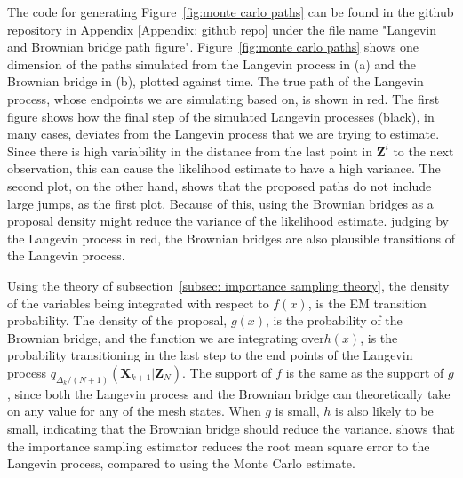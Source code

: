 The code for generating Figure~\ref{fig:monte carlo paths} can be found in the github repository in Appendix \ref{Appendix: github repo} under the file name "Langevin and Brownian bridge path figure". Figure~\ref{fig:monte carlo paths} shows one dimension of the paths simulated from the Langevin process in (a) and the Brownian bridge in (b), plotted against time. The true path of the Langevin process, whose endpoints we are simulating based on, is shown in red. The first figure shows how the final step of the simulated Langevin processes (black), in many cases, deviates from the Langevin process that we are trying to estimate. Since there is high variability in the distance from the last point in $\textbf{Z}^i$ to the next observation, this can cause the likelihood estimate to have a high variance. The second plot, on the other hand, shows that the proposed paths do not include large jumps, as the first plot. Because of this, using the Brownian bridges as a proposal density might reduce the variance of the likelihood estimate. judging by the Langevin process in red, the Brownian bridges are also plausible transitions of the Langevin process. 


Using the theory of subsection~\ref{subsec: importance sampling theory}, the density of the variables being integrated with respect to $f(x)$, is the EM transition probability. The density of the proposal, $g(x)$, is the probability of the Brownian bridge, and the function we are integrating over$h(x)$, is the probability transitioning in the last step to the end points of the Langevin process $q_{\Delta_k/(N+1)}(\textbf{X}_{k+1}|\textbf{Z}_N)$. The support of $f$ is the same as the support of $g$, since both the Langevin process and the Brownian bridge can theoretically take on any value for any of the mesh states. When $g$ is small, $h$ is also likely to be small, indicating that the Brownian bridge should reduce the variance. \textcite{durham_numerical_2002}  shows that the importance sampling estimator reduces the root mean square error to the Langevin process, compared to using the Monte Carlo estimate.


